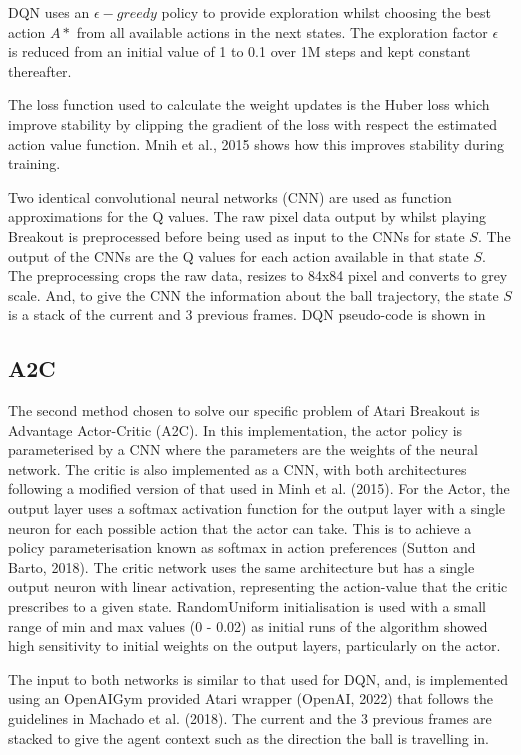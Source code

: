 \documentclass{article}
\begin{document}
DQN uses an $\epsilon-greedy$ policy to provide exploration whilst choosing the best action $A*$ from all available actions in the next states.
The exploration factor $\epsilon$ is reduced from an initial value of 1 to 0.1 over 1M steps and kept constant thereafter.

The loss function used to calculate the weight updates is the Huber loss which improve stability by clipping the gradient of the loss with respect the estimated action value function. Mnih et al., 2015 shows how this improves stability during training.

Two identical convolutional neural networks (CNN) are used as function approximations for the Q values. The raw pixel data output by  whilst playing Breakout is preprocessed before being used as input to the CNNs for state $S$. The output of the CNNs are the Q values for each action available in that state $S$.
The preprocessing crops the raw data, resizes to 84x84 pixel and converts to grey scale. And, to give the CNN the information about the ball trajectory, the state $S$ is a stack of the current and 3 previous frames.
DQN pseudo-code is shown in 

\subsection{A2C}

The second method chosen to solve our specific problem of Atari Breakout is Advantage Actor-Critic (A2C). In this implementation, the actor policy is parameterised by a CNN where the parameters are the weights of the neural network. The critic is also implemented as a CNN, with both architectures following a modified version of that used in Minh et al. (2015). For the Actor, the output layer uses a softmax activation function for the output layer with a single neuron for each possible action that the actor can take. This is to achieve a policy parameterisation known as softmax in action preferences (Sutton and Barto, 2018). The critic network uses the same architecture but has a single output neuron with linear activation, representing the action-value that the critic prescribes to a given state. RandomUniform initialisation is used with a small range of min and max values (0 - 0.02) as initial runs of the algorithm showed high sensitivity to initial weights on the output layers, particularly on the actor.

The input to both networks is similar to that used for DQN, and, is implemented using an OpenAIGym provided Atari wrapper (OpenAI, 2022) that follows the guidelines in Machado et al. (2018). The current and the 3 previous frames are stacked to give the agent context such as the direction the ball is travelling in.
\end{document}
